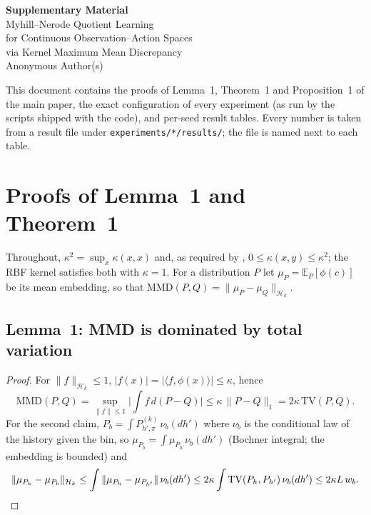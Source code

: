\documentclass[10pt]{article}
\newcommand{\bbE}{\mathbb{E}}
\newcommand{\mmd}{\mathrm{MMD}}
\newcommand{\TV}{\mathrm{TV}}
\newcommand{\RKHS}{\mathcal{H}_k}
\begin{document}
\begin{center}
  {\LARGE\bfseries Supplementary Material}\\[4pt]
  {\large Myhill--Nerode Quotient Learning\\
          for Continuous Observation--Action Spaces\\
          via Kernel Maximum Mean Discrepancy}\\[4pt]
  {\normalsize Anonymous Author(s)}
\end{center}

\vspace{1em}

This document contains the proofs of Lemma~1, Theorem~1 and Proposition~1 of
the main paper, the exact configuration of every experiment (as run by the
scripts shipped with the code), and per-seed result tables.  Every number is
taken from a result file under \texttt{experiments/*/results/}; the file is
named next to each table.

\section{Proofs of Lemma~1 and Theorem~1}
\label{sec:proof-main}

Throughout, $\kappa^2=\sup_x\kappa(x,x)$ and, as required by
\citet[Thm.~7]{Gretton2012}, $0\le\kappa(x,y)\le\kappa^2$; the RBF kernel
satisfies both with $\kappa=1$.  For a distribution $P$ let $\mu_P=\bbE_P[\phi(c)]$
be its mean embedding, so that $\mmd(P,Q)=\|\mu_P-\mu_Q\|_{\RKHS}$.

\subsection{Lemma~1: MMD is dominated by total variation}

\begin{proof}
For $\|f\|_{\RKHS}\le1$, $|f(x)|=|\langle f,\phi(x)\rangle|\le\kappa$, hence
\[
  \mmd(P,Q)=\sup_{\|f\|\le1}\Big|\int f\,d(P-Q)\Big|
  \le\kappa\,\|P-Q\|_1=2\kappa\,\TV(P,Q).
\]
For the second claim, $P_b=\int P^{(k)}_{h',\pi}\,\nu_b(dh')$ where $\nu_b$ is
the conditional law of the history given the bin, so
$\mu_{P_b}=\int\mu_{P_{h'}}\nu_b(dh')$ (Bochner integral; the embedding is
bounded) and
\[
  \|\mu_{P_h}-\mu_{P_b}\|_{\RKHS}\le\int\|\mu_{P_h}-\mu_{P_{h'}}\|\,\nu_b(dh')
  \le2\kappa\int\TV(P_h,P_{h'})\,\nu_b(dh')\le2\kappa L\,w_b .\qedhere
\]
\end{proof}
\end{document}
